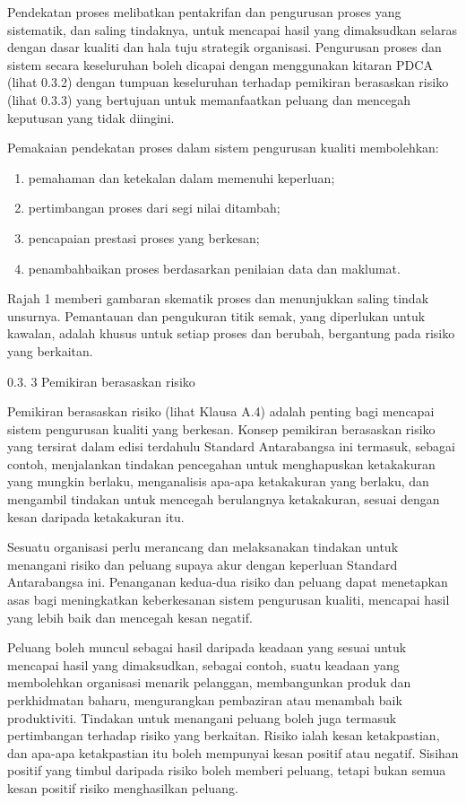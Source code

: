 \documentclass[
]{article}
\begin{document}
Pendekatan proses melibatkan pentakrifan dan pengurusan proses yang
sistematik, dan saling tindaknya, untuk mencapai hasil yang dimaksudkan
selaras dengan dasar kualiti dan hala tuju strategik organisasi.
Pengurusan proses dan sistem secara keseluruhan boleh dicapai dengan
menggunakan kitaran PDCA (lihat 0.3.2) dengan tumpuan keseluruhan
terhadap pemikiran berasaskan risiko (lihat 0.3.3) yang bertujuan untuk
memanfaatkan peluang dan mencegah keputusan yang tidak diingini.

Pemakaian pendekatan proses dalam sistem pengurusan kualiti membolehkan:

\begin{enumerate}
\def\labelenumi{\alph{enumi})}
\item
  pemahaman dan ketekalan dalam memenuhi keperluan;
\item
  pertimbangan proses dari segi nilai ditambah;
\item
  pencapaian prestasi proses yang berkesan;
\item
  penambahbaikan proses berdasarkan penilaian data dan maklumat.
\end{enumerate}

Rajah 1 memberi gambaran skematik proses dan menunjukkan saling tindak
unsurnya. Pemantauan dan pengukuran titik semak, yang diperlukan untuk
kawalan, adalah khusus untuk setiap proses dan berubah, bergantung pada
risiko yang berkaitan.

0.3. 3 Pemikiran berasaskan risiko

Pemikiran berasaskan risiko (lihat Klausa A.4) adalah penting bagi
mencapai sistem pengurusan kualiti yang berkesan. Konsep pemikiran
berasaskan risiko yang tersirat dalam edisi terdahulu Standard
Antarabangsa ini termasuk, sebagai contoh, menjalankan tindakan
pencegahan untuk menghapuskan ketakakuran yang mungkin berlaku,
menganalisis apa-apa ketakakuran yang berlaku, dan mengambil tindakan
untuk mencegah berulangnya ketakakuran, sesuai dengan kesan daripada
ketakakuran itu.

Sesuatu organisasi perlu merancang dan melaksanakan tindakan untuk
menangani risiko dan peluang supaya akur dengan keperluan Standard
Antarabangsa ini. Penanganan kedua-dua risiko dan peluang dapat
menetapkan asas bagi meningkatkan keberkesanan sistem pengurusan
kualiti, mencapai hasil yang lebih baik dan mencegah kesan negatif.

Peluang boleh muncul sebagai hasil daripada keadaan yang sesuai untuk
mencapai hasil yang dimaksudkan, sebagai contoh, suatu keadaan yang
membolehkan organisasi menarik pelanggan, membangunkan produk dan
perkhidmatan baharu, mengurangkan pembaziran atau menambah baik
produktiviti. Tindakan untuk menangani peluang boleh juga termasuk
pertimbangan terhadap risiko yang berkaitan. Risiko ialah kesan
ketakpastian, dan apa-apa ketakpastian itu boleh mempunyai kesan positif
atau negatif. Sisihan positif yang timbul daripada risiko boleh memberi
peluang, tetapi bukan semua kesan positif risiko menghasilkan peluang.
\end{document}
